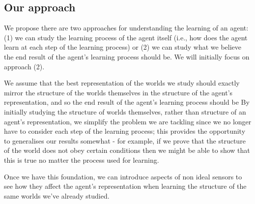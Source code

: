 \subsection{Our approach}

We propose there are two approaches for understanding the learning of an agent: (1) we can study the learning process of the agent itself (i.e., how does the agent learn at each step of the learning process) or (2) we can study what we believe the end result of the agent's learning process should be.
We will initially focus on approach (2).

We assume that the best representation of the worlds we study should exactly mirror the structure of the worlds themselves in the structure of the agent's representation, and so the end result of the agent's learning process should be
By initially studying the structure of worlds themselves, rather than structure of an agent's representation, we simplify the problem we are tackling since we no longer have to consider each step of the learning process; this provides the opportunity to generalises our results somewhat - for example, if we prove that the structure of the world does not obey certain conditions then we might be able to show that this is true no matter the process used for learning.

Once we have this foundation, we can introduce aspects of non ideal sensors to see how they affect the agent's representation when learning the structure of the same worlds we've already studied.

